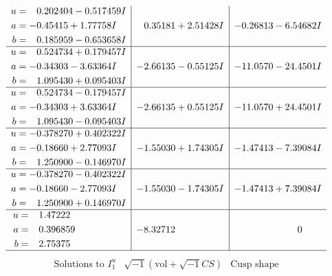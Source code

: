 \documentclass[1p]{elsarticle_modified}
\theoremstyle{definition}
\newcommand{\I}{\sqrt{-1}}
\begin{document}
$$\begin{array}{c|c|c}
\begin{aligned}
u &= \phantom{-}0.202404 - 0.517459 I \\
a &= -0.45415 + 1.77758 I \\
b &= \phantom{-}0.185959 - 0.653658 I\end{aligned}
 & \phantom{-}0.35181 + 2.51428 I & -0.26813 - 6.54682 I \\ \hline\begin{aligned}
u &= \phantom{-}0.524734 + 0.179457 I \\
a &= -0.34303 - 3.63364 I \\
b &= \phantom{-}1.095430 + 0.095403 I\end{aligned}
 & -2.66135 - 0.55125 I & -11.0570 - 24.4501 I \\ \hline\begin{aligned}
u &= \phantom{-}0.524734 - 0.179457 I \\
a &= -0.34303 + 3.63364 I \\
b &= \phantom{-}1.095430 - 0.095403 I\end{aligned}
 & -2.66135 + 0.55125 I & -11.0570 + 24.4501 I \\ \hline\begin{aligned}
u &= -0.378270 + 0.402322 I \\
a &= -0.18660 + 2.77093 I \\
b &= \phantom{-}1.250900 - 0.146970 I\end{aligned}
 & -1.55030 + 1.74305 I & -1.47413 - 7.39084 I \\ \hline\begin{aligned}
u &= -0.378270 - 0.402322 I \\
a &= -0.18660 - 2.77093 I \\
b &= \phantom{-}1.250900 + 0.146970 I\end{aligned}
 & -1.55030 - 1.74305 I & -1.47413 + 7.39084 I \\ \hline\begin{aligned}
u &= \phantom{-}1.47222\phantom{ +0.000000I} \\
a &= \phantom{-}0.396859\phantom{ +0.000000I} \\
b &= \phantom{-}2.75375\phantom{ +0.000000I}\end{aligned}
 & -8.32712\phantom{ +0.000000I} & \phantom{-0.000000 } 0\\
 \hline 
 \end{array}$$\newpage$$\begin{array}{c|c|c}  
\text{Solutions to }I^u_{1}& \I (\text{vol} + \sqrt{-1}CS) & \text{Cusp shape}\\
 \hline 
\begin{aligned}

\end{aligned}
\end{array}$$
\end{document}
